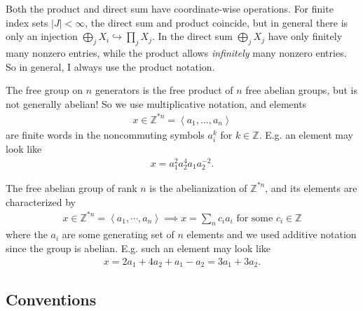 \begin{remark}

Both the product and direct sum have coordinate-wise operations. For
finite index sets \({\left\lvert {J} \right\rvert}< \infty\), the direct
sum and product coincide, but in general there is only an injection
\(\bigoplus_j X_i \hookrightarrow\prod_j X_j\). In the direct sum
\(\bigoplus_j X_j\) have only finitely many nonzero entries, while the
product allows \emph{infinitely} many nonzero entries. So in general, I
always use the product notation.

\end{remark}

\begin{remark}

The free group on \(n\) generators is the free product of \(n\) free
abelian groups, but is not generally abelian! So we use multiplicative
notation, and elements
\begin{align*}
x \in {\mathbb{Z}}^{\ast n} = \left< a_1, \ldots, a_n\right>
\end{align*}
are finite words in the noncommuting symbols \(a_i^k\) for
\(k\in {\mathbb{Z}}\). E.g. an element may look like
\begin{align*}
x = a_1^2 a_2^4 a_1 a_2^{-2}
.\end{align*}

\end{remark}

\begin{remark}

The free abelian group of rank \(n\) is the abelianization of
\({\mathbb{Z}}^{\ast n}\), and its elements are characterized by
\begin{align*}
x\in {\mathbb{Z}}^{\ast n} = \left\langle{ a_1, \cdots, a_n }\right\rangle \implies x = \sum_n c_i a_i \text{ for some } c_i \in {\mathbb{Z}}
\end{align*}
where the \(a_i\) are some generating set of \(n\) elements and we used
additive notation since the group is abelian. E.g. such an element may
look like
\begin{align*}
x = 2a_1 + 4a_2 + a_1 - a_2 = 3a_1 + 3a_2
.\end{align*}

\end{remark}

\hypertarget{conventions}{%
\subsection{Conventions}\label{conventions}}


